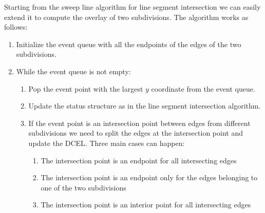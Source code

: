 Starting from the sweep line algorithm for line segment intersection we can easily extend it to compute the overlay of two subdivisions. The algorithm works as follows:
\begin{enumerate}
    \item Initialize the event queue with all the endpoints of the edges of the two subdivisions.
    \item While the event queue is not empty:
          \begin{enumerate}
              \item Pop the event point with the largest $y$ coordinate from the event queue.
              \item Update the status structure as in the line segment intersection algorithm.
              \item If the event point is an intersection point between edges from different subdivisions we need to split the edges at the intersection point and update the DCEL. Three main cases can happen:
                    \begin{enumerate}
                        \item The intersection point is an endpoint for all intersecting edges
                        \item The intersection point is an endpoint only for the edges belonging to one of the two subdivisions
                        \item The intersection point is an interior point for all intersecting edges
                    \end{enumerate}
          \end{enumerate}
\end{enumerate}

